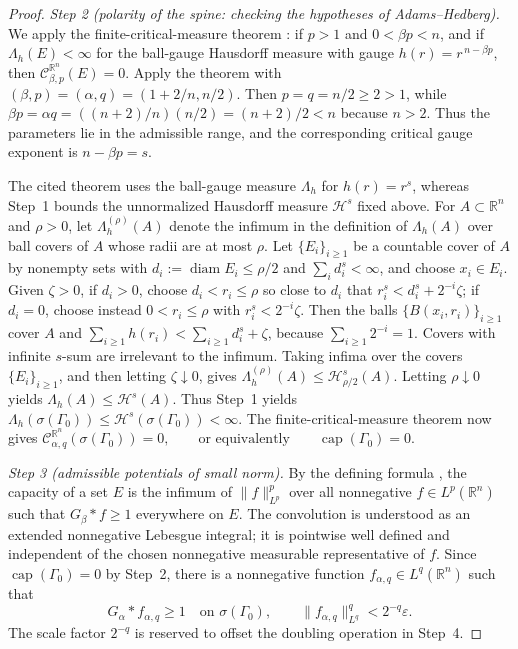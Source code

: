 \documentclass[12pt,oneside,a4paper]{article}
\theoremstyle{mytheorem}
\theoremstyle{remark}
\theoremstyle{definition}
\begin{document}
\begin{proof}
\smallskip\noindent\emph{Step 2 (polarity of the spine: checking the hypotheses of Adams--Hedberg).}
We apply the finite-critical-measure theorem \cite[Theorem~5.1.9]{zbMATH00824833}:
if $p>1$ and $0<\beta p<n$, and if $\Lambda_h(E)<\infty$ for the ball-gauge
Hausdorff measure with gauge $h(r)=r^{\,n-\beta p}$, then
$\mathcal{C}_{\beta,p}^{\mathbb R^n}(E)=0$.
Apply the theorem with
$(\beta,p)=(\alpha,q)=(1+2/n,n/2)$.  Then $p=q=n/2\ge2>1$, while
$\beta p=\alpha q=((n+2)/n)(n/2)=(n+2)/2<n$ because $n>2$.  Thus the parameters
lie in the admissible range, and the corresponding critical gauge
exponent is $n-\beta p=s$.

The cited theorem uses the ball-gauge measure $\Lambda_h$ for
$h(r)=r^s$, whereas Step~1 bounds the unnormalized Hausdorff measure
$\mathcal{H}^s$ fixed above.  For $A\subset\mathbb R^n$ and $\rho>0$, let
$\Lambda_h^{(\rho)}(A)$ denote the
infimum in the definition of $\Lambda_h(A)$ over ball covers of $A$
whose radii are at most $\rho$.  Let $\{E_i\}_{i\geq1}$ be a countable
cover of $A$ by nonempty sets with
$d_i:=\operatorname{diam}E_i\leq\rho/2$ and
$\sum_i d_i^s<\infty$, and choose $x_i\in E_i$.  Given $\zeta>0$, if
$d_i>0$, choose $d_i<r_i\leq\rho$ so close to $d_i$ that
$r_i^s<d_i^s+2^{-i}\zeta$; if $d_i=0$, choose instead
$0<r_i\leq\rho$ with $r_i^s<2^{-i}\zeta$.  Then the balls
$\{B(x_i,r_i)\}_{i\geq1}$ cover $A$ and
$\sum_{i\geq1}h(r_i)<\sum_{i\geq1}d_i^s+\zeta$, because
$\sum_{i\geq1}2^{-i}=1$.  Covers with infinite $s$-sum are
irrelevant to the infimum.  Taking infima over the covers
$\{E_i\}_{i\geq1}$, and then letting $\zeta\downarrow0$, gives
$\Lambda_h^{(\rho)}(A)\leq\mathcal{H}^s_{\rho/2}(A)$.  Letting
$\rho\downarrow0$ yields
$\Lambda_h(A)\leq\mathcal{H}^s(A)$.  Thus
Step~1 yields $\Lambda_h(\sigma(\Gamma_0))
 \le \mathcal{H}^s(\sigma(\Gamma_0))<\infty.$  The
finite-critical-measure theorem now gives
$\mathcal{C}_{\alpha,q}^{\mathbb R^n}(\sigma(\Gamma_0))=0,
 \qquad\text{or equivalently}\qquad
 \operatorname{cap}(\Gamma_0)=0.$


\smallskip\noindent\emph{Step 3 (admissible potentials of small norm).}
By the defining formula \cite[Definition~2.3.3]{zbMATH00824833}, the capacity of a
set $E$ is the infimum of $\|f\|_{L^p}^p$ over all nonnegative
$f\in L^p(\mathbb R^n)$ such that $G_\beta*f\ge1$ everywhere on $E$.
The convolution is understood as an extended nonnegative Lebesgue
integral; it is pointwise well defined and independent of the chosen
nonnegative measurable representative of $f$. Since
$\operatorname{cap}(\Gamma_0)=0$ by Step~2, there is a nonnegative
function $f_{\alpha,q}\in L^q(\mathbb R^n)$ such that
\[
G_\alpha*f_{\alpha,q}\ge1\quad\text{on }\sigma(\Gamma_0),
\qquad
\|f_{\alpha,q}\|_{L^q}^q<2^{-q}\varepsilon.
\]
The scale factor $2^{-q}$ is reserved to offset the doubling operation
in Step~4.


\end{proof}
\end{document}
